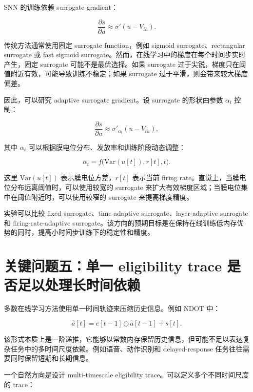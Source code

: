 \documentclass[11pt]{ctexart}
\begin{document}
SNN 的训练依赖 surrogate gradient：

\begin{equation}
\frac{\partial s}{\partial u}
\approx
\sigma'(u-V_{th}).
\end{equation}

传统方法通常使用固定 surrogate function，例如 sigmoid surrogate、rectangular surrogate 或 fast sigmoid surrogate。然而，在线学习中的梯度在每个时间步实时产生，固定 surrogate 可能不是最优选择。如果 surrogate 过于尖锐，梯度只在阈值附近有效，可能导致训练不稳定；如果 surrogate 过于平滑，则会带来较大梯度偏差。

因此，可以研究 adaptive surrogate gradient。设 surrogate 的形状由参数 $\alpha_t$ 控制：

\begin{equation}
\frac{\partial s}{\partial u}
\approx
\sigma'_{\alpha_t}(u-V_{th}),
\end{equation}

其中 $\alpha_t$ 可以根据膜电位分布、发放率和训练阶段动态调整：

\begin{equation}
\alpha_t = f\big(\mathrm{Var}(u[t]), r[t], t\big).
\end{equation}

这里 $\mathrm{Var}(u[t])$ 表示膜电位方差，$r[t]$ 表示当前 firing rate。直觉上，当膜电位分布远离阈值时，可以使用较宽的 surrogate 来扩大有效梯度区域；当膜电位集中在阈值附近时，可以使用较窄的 surrogate 来提高梯度精度。

实验可以比较 fixed surrogate、time-adaptive surrogate、layer-adaptive surrogate 和 firing-rate-adaptive surrogate。该方向的预期目标是在保持在线训练低内存优势的同时，提高小时间步训练下的稳定性和精度。

\section{关键问题五：单一 eligibility trace 是否足以处理长时间依赖}

多数在线学习方法使用单一时间轨迹来压缩历史信息。例如 NDOT 中：

\begin{equation}
\hat a[t]
=
e[t-1]\odot \hat a[t-1]+s[t].
\end{equation}

该形式本质上是一阶递推，它能够以常数内存保留历史信息，但可能不足以表达复杂任务中的多时间尺度依赖。例如语音、动作识别和 delayed-response 任务往往需要同时保留短期和长期信息。

一个自然方向是设计 multi-timescale eligibility trace。可以定义多个不同时间尺度的 trace：
\end{document}
